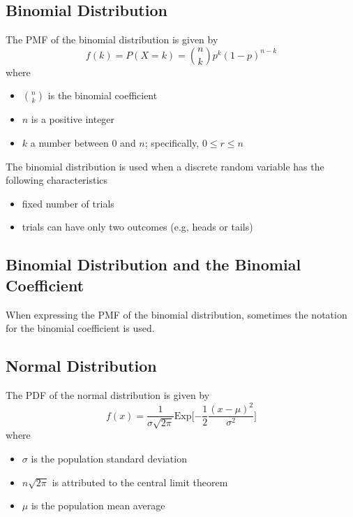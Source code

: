 \documentclass{article}
\begin{document}
\subsection{Binomial Distribution}
The PMF of the binomial distribution is given by
$$
f(k)=P(X=k)={n \choose k} p^k (1-p)^{n-k}
$$
where

\begin{itemize}
    \item ${n \choose k}$ is the binomial coefficient
    \item $n$ is a positive integer
    \item $k$ a number between $0$ and $n$; specifically, $0 \leq r \leq n$
\end{itemize}

The binomial distribution is used when a discrete random variable has the following characteristics

\begin{itemize}
    \item fixed number of trials
    \item trials can have only two outcomes (e.g, heads or tails)
\end{itemize}

\subsection{Binomial Distribution and the Binomial Coefficient}
When expressing the PMF of the binomial distribution, sometimes the notation for the binomial coefficient is used.

\subsection{Normal Distribution}
The PDF of the normal distribution is given by
$$
f(x)=\frac{1}{\sigma{\sqrt{2\pi}}} \text{Exp} \bigg [ {-\frac{1}{2} \frac{(x-\mu)^2}{\sigma^2}} \bigg ]
$$
where

\begin{itemize}
    \item $\sigma$ is the population standard deviation
    \item $n\sqrt{2\pi}$ is attributed to the central limit theorem
    \item $\mu$ is the population mean average
\end{itemize}
\end{document}
